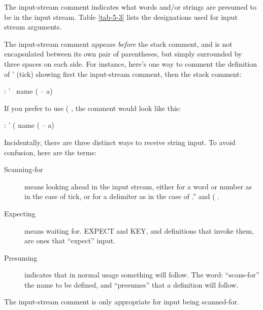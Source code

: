 The input-stream comment indicates what words and/or strings are
presumed to be in the input stream. Table \ref{tab-5-3} lists the designations used
for input stream arguments.


The input-stream comment appears \emph{before} the stack comment, and
is not encapsulated between its own pair of parentheses, but simply surrounded
by three spaces on each side.  For instance, here's one way to
comment the definition of ' (tick) showing first the input-stream comment,
then the stack comment:
\begin{Code}
: '   \ name   ( -- a)
\end{Code}
If you prefer to use ( , the comment would look like this:
\begin{Code}
: '   ( name   ( -- a)
\end{Code}

Incidentally, there are three distinct ways to receive string input.  To
avoid confusion, here are the terms:
\begin{description}
\item[Scanning-for] means looking ahead in the input stream, either for a word or
number as in the case of tick, or for a delimiter as in the case of .'' and ( .
\item[Expecting] means waiting for.  EXPECT and KEY, and definitions that invoke
them, are ones that ``expect'' input.
\item[Presuming] indicates that in normal usage something will follow.  The word:
``scans-for'' the name to be defined, and ``presumes'' that a definition will
follow.
\end{description}
The input-stream comment is only appropriate for input being scanned-for.

